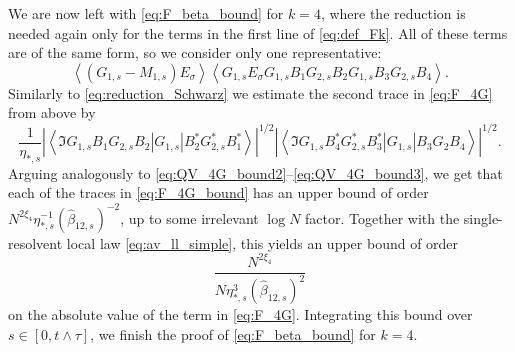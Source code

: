 \documentclass[10pt]{amsart}
\numberwithin{equation}{section}
\begin{document}
We are now left with \eqref{eq:F_beta_bound} for $k=4$, where the reduction is needed again only for the terms in the first line of \eqref{eq:def_Fk}. All of these terms are of the same form, so we consider only one representative:
\begin{equation}
\left\langle (G_{1,s}-M_{1,s})E_\sigma\right\rangle \left\langle G_{1,s}E_\sigma G_{1,s}B_1G_{2,s}B_2G_{1,s}B_3G_{2,s}B_4\right\rangle.
\label{eq:F_4G}
\end{equation}
Similarly to \eqref{eq:reduction_Schwarz} we estimate the second trace in \eqref{eq:F_4G} from above by
\begin{equation}
\frac{1}{\eta_{*,s}} \left\vert\left\langle \Im G_{1,s}B_1G_{2,s}B_2|G_{1,s}|B_2^*G_{2,s}^*B_1^*\right\rangle\right\vert^{1/2}\left\vert\left\langle \Im G_{1,s} B_4^*G_{2,s}^*B_3^*|G_{1,s}|B_3G_2B_4\right\rangle\right\vert^{1/2}.
\label{eq:F_4G_bound}
\end{equation}
Arguing analogously to \eqref{eq:QV_4G_bound2}--\eqref{eq:QV_4G_bound3}, we get that each of the traces in \eqref{eq:F_4G_bound} has an upper bound of order $N^{2\xi_4}\eta_{*,s}^{-1}(\widehat{\beta}_{12,s})^{-2}$, up to some irrelevant $\log N$ factor. Together with the single-resolvent local law \eqref{eq:av_ll_simple}, this yields an upper bound of order
\begin{equation*}
\frac{N^{2\xi_4}}{N\eta_{*,s}^3(\widehat{\beta}_{12,s})^2}
\end{equation*}
on the absolute value of the term in \eqref{eq:F_4G}. Integrating this bound over $s\in [0,t\wedge\tau]$, we finish the proof of \eqref{eq:F_beta_bound} for $k=4$.
\end{document}

